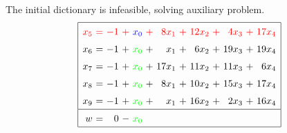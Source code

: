 \documentclass[11pt]{article}
\begin{document}
The initial dictionary is infeasible, solving auxiliary problem.
\begin{equation*}
\renewcommand{\arraystretch}{1.5} %
\begin{array}{|rcrcrcrcrcrcr|}
\hline
\color{red}x_{5} \mspace{-6mu}&\color{red}\mspace{-6mu} = \mspace{-6mu}&\color{red}\mspace{-6mu} -1 \mspace{-6mu}&\color{red}\mspace{-6mu} + \mspace{-6mu}&\color{blue}\mspace{-6mu} x_{0} \mspace{-6mu}&\color{red}\mspace{-6mu} + \mspace{-6mu}&\color{red}\mspace{-6mu} 8 x_{1} \mspace{-6mu}&\color{red}\mspace{-6mu} + \mspace{-6mu}&\color{red}\mspace{-6mu} 12 x_{2} \mspace{-6mu}&\color{red}\mspace{-6mu} + \mspace{-6mu}&\color{red}\mspace{-6mu} 4 x_{3} \mspace{-6mu}&\color{red}\mspace{-6mu} + \mspace{-6mu}&\color{red}\mspace{-6mu} 17 x_{4}\\
x_{6} \mspace{-6mu}&\mspace{-6mu} = \mspace{-6mu}&\mspace{-6mu} -1 \mspace{-6mu}&\mspace{-6mu} + \mspace{-6mu}&\color{green}\mspace{-6mu} x_{0} \mspace{-6mu}&\mspace{-6mu} + \mspace{-6mu}&\mspace{-6mu} x_{1} \mspace{-6mu}&\mspace{-6mu} + \mspace{-6mu}&\mspace{-6mu} 6 x_{2} \mspace{-6mu}&\mspace{-6mu} + \mspace{-6mu}&\mspace{-6mu} 19 x_{3} \mspace{-6mu}&\mspace{-6mu} + \mspace{-6mu}&\mspace{-6mu} 19 x_{4}\\
x_{7} \mspace{-6mu}&\mspace{-6mu} = \mspace{-6mu}&\mspace{-6mu} -1 \mspace{-6mu}&\mspace{-6mu} + \mspace{-6mu}&\color{green}\mspace{-6mu} x_{0} \mspace{-6mu}&\mspace{-6mu} + \mspace{-6mu}&\mspace{-6mu} 17 x_{1} \mspace{-6mu}&\mspace{-6mu} + \mspace{-6mu}&\mspace{-6mu} 11 x_{2} \mspace{-6mu}&\mspace{-6mu} + \mspace{-6mu}&\mspace{-6mu} 11 x_{3} \mspace{-6mu}&\mspace{-6mu} + \mspace{-6mu}&\mspace{-6mu} 6 x_{4}\\
x_{8} \mspace{-6mu}&\mspace{-6mu} = \mspace{-6mu}&\mspace{-6mu} -1 \mspace{-6mu}&\mspace{-6mu} + \mspace{-6mu}&\color{green}\mspace{-6mu} x_{0} \mspace{-6mu}&\mspace{-6mu} + \mspace{-6mu}&\mspace{-6mu} 8 x_{1} \mspace{-6mu}&\mspace{-6mu} + \mspace{-6mu}&\mspace{-6mu} 10 x_{2} \mspace{-6mu}&\mspace{-6mu} + \mspace{-6mu}&\mspace{-6mu} 15 x_{3} \mspace{-6mu}&\mspace{-6mu} + \mspace{-6mu}&\mspace{-6mu} 17 x_{4}\\
x_{9} \mspace{-6mu}&\mspace{-6mu} = \mspace{-6mu}&\mspace{-6mu} -1 \mspace{-6mu}&\mspace{-6mu} + \mspace{-6mu}&\color{green}\mspace{-6mu} x_{0} \mspace{-6mu}&\mspace{-6mu} + \mspace{-6mu}&\mspace{-6mu} x_{1} \mspace{-6mu}&\mspace{-6mu} + \mspace{-6mu}&\mspace{-6mu} 16 x_{2} \mspace{-6mu}&\mspace{-6mu} + \mspace{-6mu}&\mspace{-6mu} 2 x_{3} \mspace{-6mu}&\mspace{-6mu} + \mspace{-6mu}&\mspace{-6mu} 16 x_{4}\\
\hline
w \mspace{-6mu}&\mspace{-6mu} = \mspace{-6mu}&\mspace{-6mu} 0 \mspace{-6mu}&\mspace{-6mu} - \mspace{-6mu}&\color{green}\mspace{-6mu} x_{0} \mspace{-6mu}&\mspace{-6mu}  \mspace{-6mu}&\mspace{-6mu}  \mspace{-6mu}&\mspace{-6mu}  \mspace{-6mu}&\mspace{-6mu}  \mspace{-6mu}&\mspace{-6mu}  \mspace{-6mu}&\mspace{-6mu}  \mspace{-6mu}&\mspace{-6mu}  \mspace{-6mu}&\mspace{-6mu} \\
\hline
\end{array}
\end{equation*}
\end{document}

